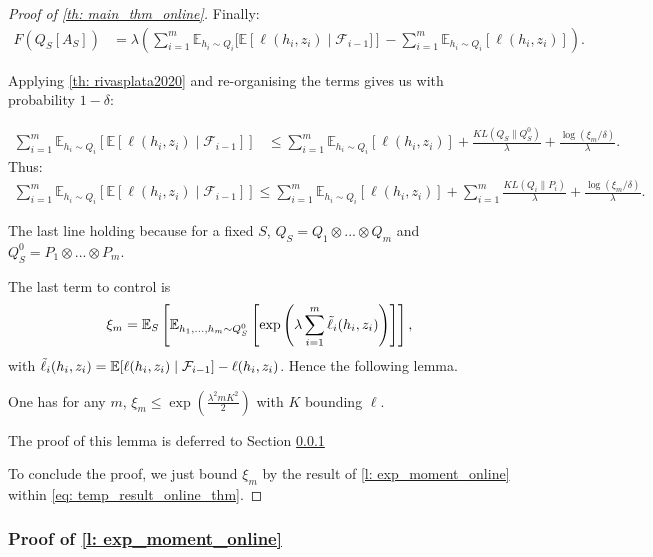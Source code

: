\begin{noaddcontents}
\begin{proof}[Proof of \cref{th: main_thm_online}]
Finally:
\begin{align*}
      F(Q_S[A_S])&= \lambda \left(\sum_{i=1}^m \mathbb{E}_{h_i\sim Q_i}[\mathbb{E}\left[\ell(h_i,z_i)\mid \mathcal{F}_{i-1}]\right]- \sum_{i=1}^m \mathbb{E}_{h_i\sim Q_i}[\ell(h_i,z_i)] \right).
\end{align*}


Applying \cref{th: rivasplata2020} and re-organising the terms gives us with probability $1-\delta$:

\begin{align*}
\sum_{i=1}^m \mathbb{E}_{h_i\sim Q_i}\left[\mathbb{E}[\ell(h_i,z_i)\mid \mathcal{F}_{i-1}]\right] & \leq \sum_{i=1}^m \mathbb{E}_{h_i\sim Q_i}[\ell(h_i,z_i)] + \frac{KL(Q_S\|Q^0_S)}{\lambda} + \frac{\log(\xi_m/\delta)}{\lambda}.
\end{align*}
\noindent Thus:
\begin{align}
  \label{eq: temp_result_online_thm}
 \sum_{i=1}^m \mathbb{E}_{h_i\sim Q_i}\left[\mathbb{E}[\ell(h_i,z_i)\mid \mathcal{F}_{i-1}]\right] \leq \sum_{i=1}^m \mathbb{E}_{h_i\sim Q_i}[\ell(h_i,z_i)] + \sum_{i=1}^m \frac{KL(Q_i\|P_i)}{\lambda} + \frac{\log(\xi_m/\delta)}{\lambda}.
\end{align}

\noindent The last line holding because for a fixed $S$, $Q_S= Q_1\otimes...\otimes Q_m$ and $Q_S^0= P_1\otimes...\otimes P_m$.

\noindent The last term to control is
\begin{align*}
\xi_m = \mathbb{E}_S\left[\mathbb{E}_{h_1,...,h_m \sim Q^0_S} \left[\exp\left(\lambda \sum_{i=1}^m \Tilde{\ell}_i(h_i,z_i)\right)\right]\right],
\end{align*}
with $\Tilde{\ell}_i(h_i,z_i)= \mathbb{E}[\ell(h_i,z_i)\mid \mathcal{F}_{i-1}]-  \ell(h_i,z_i)$. Hence the following lemma.

\begin{lemma}
\label{l: exp_moment_online}
One has for any $m$, $\xi_m \leq \exp\left(\frac{\lambda^2m K^2}{2}\right)$ with $K$ bounding $\ell$.
\end{lemma}

The proof of this lemma is deferred to Section \ref{sec: proof_exp_moment_online}


To conclude the proof, we just bound $\xi_m$ by the result of \cref{l: exp_moment_online} within \cref{eq: temp_result_online_thm}.
\end{proof}

\subsubsection{Proof of \cref{l: exp_moment_online}}
\label{sec: proof_exp_moment_online}



\end{noaddcontents}
